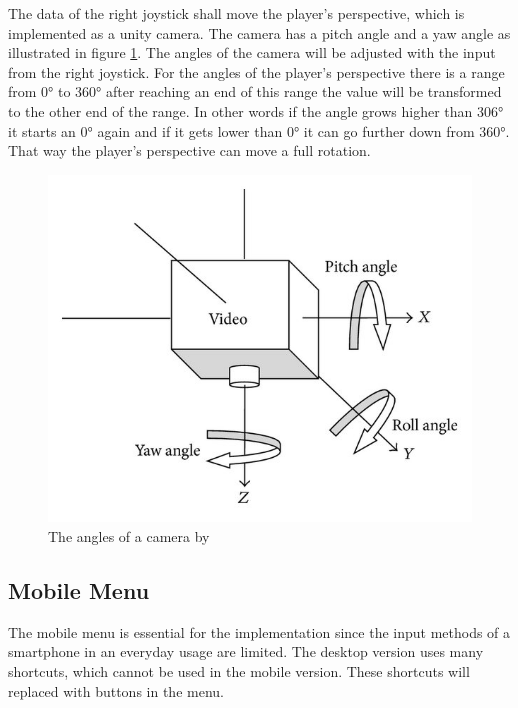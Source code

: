 The data of the right joystick shall move the player's perspective, which is implemented as a \gls{unity} camera.
The camera has a pitch angle and a yaw angle as illustrated in figure \ref{fig:camera}.
The angles of the camera will be adjusted with the input from the right joystick. 
For the angles of the player's perspective there is a range from 0° to 360° after reaching an end of this range the value will be transformed to the other end of the range.
In other words if the angle grows higher than 306° it starts an 0° again and if it gets lower than 0° it can go further down from 360°.
That way the player's perspective can move a full rotation.
\begin{figure}[htb]
    \centering
    \includegraphics[width=1\textwidth]{Implementation/img/pitch_yaw.jpg}
    \caption{The angles of a camera by \cite{Zhang2014}}\label{fig:camera}
\end{figure}

\subsection{Mobile Menu}
\label{sec:menu}

The mobile menu is essential for the implementation since the input methods of a smartphone in an everyday usage are limited.
The desktop version uses many \glspl{shortcut}, which cannot be used in the mobile version.
These \glspl{shortcut} will replaced with buttons in the menu.

